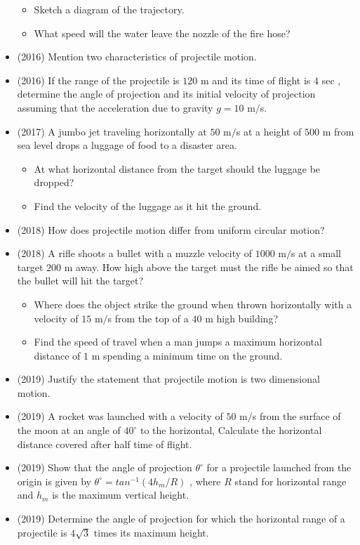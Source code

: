 \documentclass{article}
\begin{document}
\begin{itemize}
 \begin{itemize}
\item  Sketch a diagram of the trajectory.
\item What speed will the water leave the nozzle of the fire hose?
\end{itemize}
\item (2016)  Mention two characteristics of projectile motion.
\item (2016)  If the range of the projectile is $ 120$ m and its time of flight is $ 4$ sec , determine the angle of projection and its initial velocity of projection assuming that the acceleration due to gravity $ g=10$ m$/$s. 
\item (2017)  A jumbo jet traveling horizontally at $ 50$ m$/$s at a height of $ 500$ m from sea level drops a luggage of food to a disaster area.
 \begin{itemize}
\item At what horizontal distance from the target should the luggage be dropped?
\item Find the velocity of the luggage as it hit the ground. 
\end{itemize}
\item (2018)  How does projectile motion differ from uniform circular motion? 
\item (2018)  A rifle shoots a bullet with a muzzle velocity of $ 1000$ m$/$s at a small target $ 200$ m away. How high above the target must the rifle be aimed so that the bullet will hit the target? 
 \begin{itemize}
\item Where does the object strike the ground when thrown horizontally with a velocity of $ 15$ m$/$s from the top of a $ 40$ m high building? 
\item Find the speed of travel when a man jumps a maximum horizontal distance of $ 1$ m spending a minimum time on the ground.
\end{itemize}
\item (2019)  Justify the statement that projectile motion is two dimensional motion.
\item (2019)  A rocket was launched with a velocity of $ 50$ m$/$s from the surface of the moon at an angle of $ 40^{\circ}$ to the horizontal, Calculate the horizontal distance covered  after half time of flight.
\item (2019)  Show that the angle of projection $ \theta ^{\circ}$ for a projectile launched from the origin is given by $ \theta ^{\circ}= tan^{-1}(4h_{m}/R)$ , where $ R$ stand for horizontal range and $ h_{m}$ is the maximum vertical height.
\item (2019)  Determine the angle of projection for which the horizontal range of a projectile is $ 4\sqrt{3}$ times its maximum height. 
\end{itemize}
\end{document}
